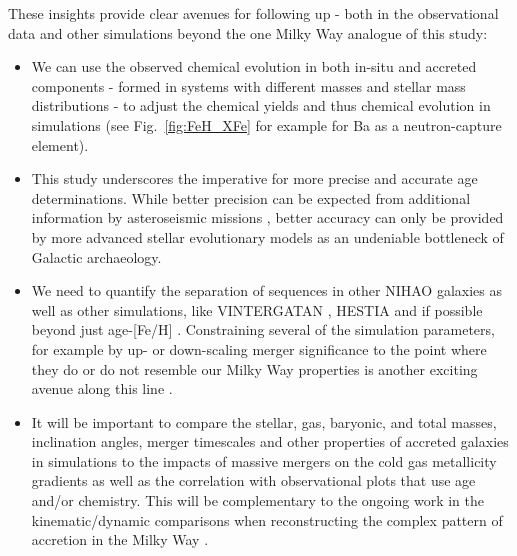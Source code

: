 \documentclass[fleqn,usenatbib]{mnras}
\begin{document}
These insights provide clear avenues for following up - both in the observational data and other simulations beyond the one Milky Way analogue of this study:
\begin{itemize}
    \item We can use the observed chemical evolution in both in-situ and accreted components - formed in systems with different masses and stellar mass distributions - to adjust the chemical yields and thus chemical evolution in simulations (see Fig.~\ref{fig:FeH_XFe} for example for Ba as a neutron-capture element).
    \item This study underscores the imperative for more precise and accurate age determinations. While better precision can be expected from additional information by asteroseismic missions \citep[see e.g.][]{Miglio2017,Mackereth2021}, better accuracy can only be provided by more advanced stellar evolutionary models \citep[see also][]{Kim2002, Schuster2012} as an undeniable bottleneck of Galactic archaeology.
    \item We need to quantify the separation of sequences in other NIHAO galaxies \citep[see e.g.][]{Lu2022, Buck2023} as well as other simulations, like \textsc{VINTERGATAN} \citep{Renaud2021, Renaud2021b, Agertz2021}, \textsc{HESTIA} \citep{Khoperskov2023, Khoperskov2023b, Khoperskov2023c} and if possible beyond just age-[Fe/H] \citep{Khoperskov2023c}. Constraining several of the simulation parameters, for example by up- or down-scaling merger significance to the point where they do or do not resemble our Milky Way properties is another exciting avenue along this line \cite{Rey2023}.
    \item It will be important to compare the stellar, gas, baryonic, and total masses, inclination angles, merger timescales and other properties of accreted galaxies in simulations to the impacts of massive mergers on the cold gas metallicity gradients \citep{Buck2023} as well as the correlation with observational plots that use age and/or chemistry. This will be complementary to the ongoing work in the kinematic/dynamic comparisons \citep[e.g.][]{Naidu2021, Khoperskov2023b} when reconstructing the complex pattern of accretion in the Milky Way \citep{Naidu2020}.
\end{itemize}
\end{document}
